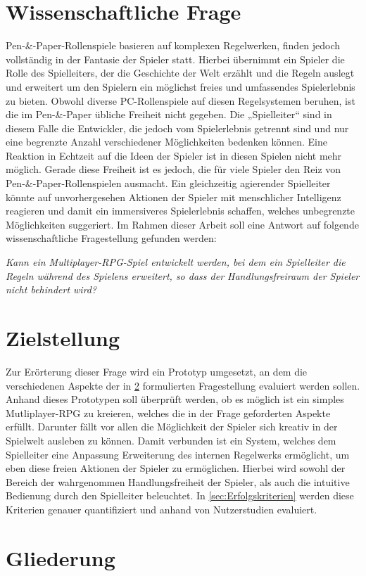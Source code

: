 \section{Wissenschaftliche Frage}
\label{sec:WissenschaftlicheFrage}

Pen-\&-Paper-Rollenspiele basieren auf komplexen Regelwerken, finden jedoch vollständig in der Fantasie der Spieler statt. Hierbei übernimmt ein Spieler die Rolle des Spielleiters, der die Geschichte der Welt erzählt und die Regeln auslegt und erweitert um den Spielern ein möglichst freies und umfassendes Spielerlebnis zu bieten. Obwohl diverse PC-Rollenspiele auf diesen Regelsystemen beruhen, ist die im Pen-\&-Paper übliche Freiheit nicht gegeben. Die „Spielleiter“ sind in diesem Falle die Entwickler, die jedoch vom Spielerlebnis getrennt sind und nur eine begrenzte Anzahl verschiedener Möglichkeiten bedenken können. Eine Reaktion in Echtzeit auf die Ideen der Spieler ist in diesen Spielen nicht mehr möglich.\newline
Gerade diese Freiheit ist es jedoch, die für viele Spieler den Reiz von Pen-\&-Paper-Rollenspielen ausmacht. Ein gleichzeitig agierender Spielleiter könnte auf unvorhergesehen Aktionen der Spieler mit menschlicher Intelligenz reagieren und damit ein immersiveres Spielerlebnis schaffen, welches unbegrenzte Möglichkeiten suggeriert. 
Im Rahmen dieser Arbeit soll eine Antwort auf folgende wissenschaftliche Fragestellung gefunden werden:
\begin{center}\parbox{0.9\linewidth}{
  \emph{Kann ein Multiplayer-RPG-Spiel entwickelt werden, bei dem ein Spielleiter die Regeln während des Spielens erweitert, so dass der Handlungsfreiraum der Spieler nicht behindert wird?}
} \end{center}

\section{Zielstellung}
\label{sec:Zielstellung}

Zur Erörterung dieser Frage wird ein Prototyp umgesetzt, an dem die verschiedenen Aspekte der in \ref{sec:Zielstellung} formulierten Fragestellung evaluiert werden sollen. Anhand dieses Prototypen soll überprüft werden, ob es möglich ist ein simples Mutliplayer-RPG zu kreieren, welches die in der Frage geforderten Aspekte erfüllt. Darunter fällt vor allen die Möglichkeit der Spieler sich kreativ in der Spielwelt ausleben zu können. Damit verbunden ist ein System, welches dem Spielleiter eine Anpassung \/ Erweiterung des internen Regelwerks ermöglicht, um eben diese freien Aktionen der Spieler zu ermöglichen. Hierbei wird sowohl der Bereich der wahrgenommen Handlungsfreiheit der Spieler, als auch die intuitive Bedienung durch den Spielleiter beleuchtet. In \ref{sec:Erfolgskriterien} werden diese Kriterien genauer quantifiziert und anhand von Nutzerstudien evaluiert. 

\section{Gliederung}
\label{sec:Gliederung}

